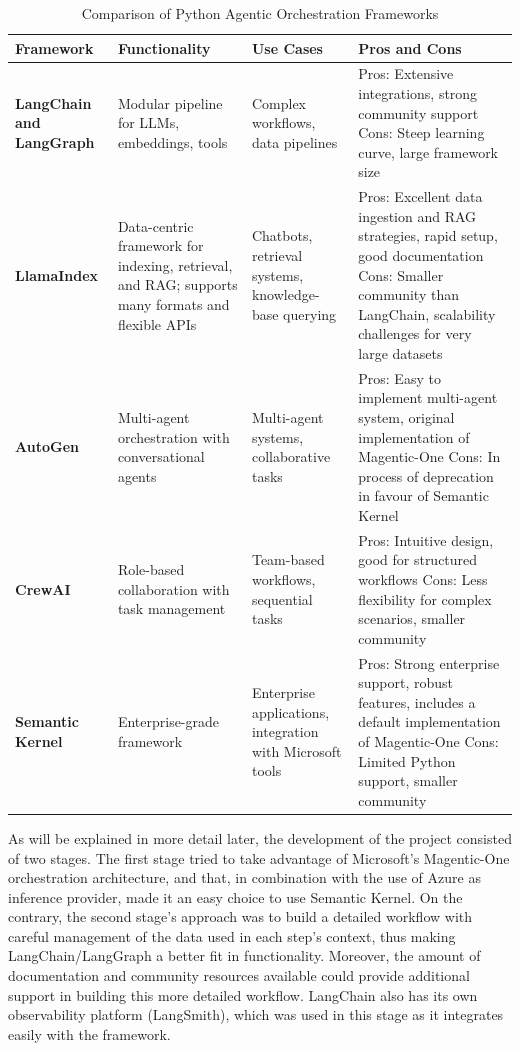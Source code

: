 \documentclass[a4paper]{report}
\begin{document}
\begin{table}[h]
\centering
\begin{tabular}{|p{3cm}|p{3cm}|p{2.5cm}|p{5.5cm}|}
    \hline
    \textbf{Framework} & \textbf{Functionality} & \textbf{Use Cases} & \textbf{Pros and Cons} \\ \hline
    \textbf{LangChain and \newline LangGraph} & Modular pipeline for LLMs, embeddings, tools & Complex workflows, data pipelines & Pros: Extensive integrations, strong community support \newline Cons: Steep learning curve, large framework size \\ \hline
    \textbf{LlamaIndex} & Data-centric framework for indexing, retrieval, and RAG; supports many formats and flexible APIs & Chatbots, retrieval systems, knowledge-base querying & Pros: Excellent data ingestion and RAG strategies, rapid setup, good documentation \newline Cons: Smaller community than LangChain, scalability challenges for very large datasets \\ \hline
    \textbf{AutoGen} & Multi-agent orchestration with conversational agents & Multi-agent systems, collaborative tasks & Pros: Easy to implement multi-agent system, original implementation of Magentic-One \newline Cons: In process of deprecation in favour of Semantic Kernel \\
    \hline
    \textbf{CrewAI} & Role-based collaboration with task management & Team-based workflows, sequential tasks & Pros: Intuitive design, good for structured workflows \newline Cons: Less flexibility for complex scenarios, smaller community \\
    \hline
    \textbf{Semantic Kernel} & Enterprise-grade framework & Enterprise applications, integration with Microsoft tools & Pros: Strong enterprise support, robust features, includes a default implementation of Magentic-One \newline Cons: Limited Python support, smaller community \\
    \hline
\end{tabular}
\caption{Comparison of Python Agentic Orchestration Frameworks}
\label{tab:orchestration_frameworks_uses}
\end{table}

As will be explained in more detail later, the development of the project consisted of two stages. The first stage tried to take advantage of Microsoft's Magentic-One orchestration architecture, and that, in combination with the use of Azure as inference provider, made it an easy choice to use Semantic Kernel. On the contrary, the second stage's approach was to build a detailed workflow with careful management of the data used in each step's context, thus making LangChain/LangGraph a better fit in functionality. Moreover, the amount of documentation and community resources available could provide additional support in building this more detailed workflow. LangChain also has its own observability platform (LangSmith), which was used in this stage as it integrates easily with the framework.
\end{document}
